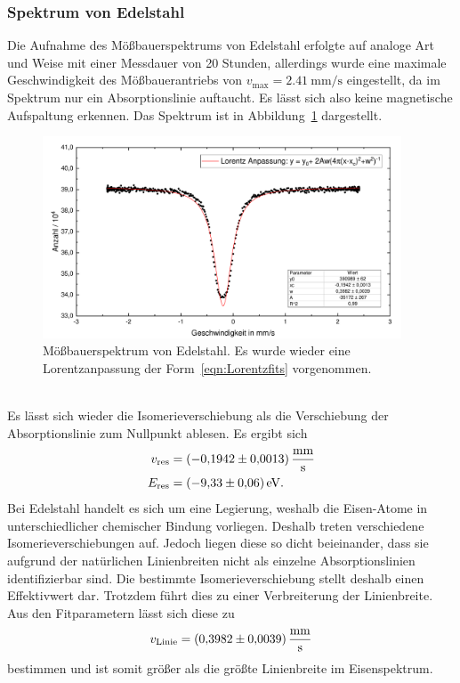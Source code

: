 \documentclass[a4paper,twoside,final]{article}
\begin{document}
\subsubsection{Spektrum von Edelstahl}
Die Aufnahme des Mößbauerspektrums von Edelstahl erfolgte auf analoge Art und Weise mit einer Messdauer von 20 Stunden, allerdings wurde eine maximale Geschwindigkeit des Mößbauerantriebs von $v_\text{max} = \SI{2,41}{\milli\metre\per\second}$ eingestellt, da im Spektrum nur ein Absorptionslinie auftaucht. Es lässt sich also keine magnetische Aufspaltung erkennen. Das Spektrum ist in Abbildung~\ref{fig:Edelstahl_Spektrum} dargestellt.
\begin{figure}[htp]
    \centering
    \includegraphics[width=0.95\textwidth]{Bilder/Moessbauer_Edelstahl_Lorentz.pdf}
    \caption{Mößbauerspektrum von Edelstahl. Es wurde wieder eine Lorentzanpassung der Form~\eqref{eqn:Lorentzfits} vorgenommen.}
    \label{fig:Edelstahl_Spektrum}
\end{figure}\\
Es lässt sich wieder die Isomerieverschiebung als die Verschiebung der Absorptionslinie zum Nullpunkt ablesen. Es ergibt sich
\begin{align}
  v_\text{res} &= \SI[per-mode=fraction, separate-uncertainty]{-0,1942\pm 0,0013}{\milli\metre\per\second}\\
  E_\text{res} &= \SI[separate-uncertainty]{-9,33
\pm 0,06}{\electronvolt}.
\end{align}
Bei Edelstahl handelt es sich um eine Legierung, weshalb die Eisen-Atome in unterschiedlicher chemischer Bindung vorliegen. Deshalb treten verschiedene Isomerieverschiebungen auf. Jedoch liegen diese so dicht beieinander, dass sie aufgrund der natürlichen Linienbreiten nicht als einzelne Absorptionslinien identifizierbar sind. Die bestimmte Isomerieverschiebung stellt deshalb einen Effektivwert dar. Trotzdem führt dies zu einer Verbreiterung der Linienbreite. Aus den Fitparametern lässt sich diese zu
\begin{align}
  v_\text{Linie} = \SI[per-mode=fraction, separate-uncertainty]{0,3982 \pm 0,0039}{\milli\metre\per\second}
\end{align}
bestimmen und ist somit größer als die größte Linienbreite im Eisenspektrum.
\end{document}
